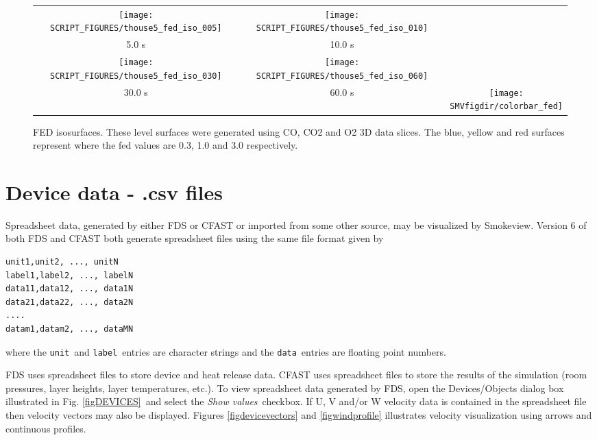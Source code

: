 \documentclass[11pt,twoside]{book}
\newcommand{\figheightAbar}{2.2in}
\begin{document}
\begin{figure}[bph]
\begin{center}
\begin{tabular}{ccc}
\texttt{[image: SCRIPT\_FIGURES/thouse5\_fed\_iso\_005]}&
\texttt{[image: SCRIPT\_FIGURES/thouse5\_fed\_iso\_010]}\\
5.0 s&10.0 s\\
\texttt{[image: SCRIPT\_FIGURES/thouse5\_fed\_iso\_030]}&
\texttt{[image: SCRIPT\_FIGURES/thouse5\_fed\_iso\_060]}&\\
30.0 s&60.0 s
&\raisebox{0.0ex}[0pt]{\texttt{[image: \\SMVfigdir/colorbar\_fed]}}\\
\end{tabular}
\caption [FED slices.]
{FED isosurfaces.
These level surfaces were generated using CO, CO2 and O2 3D data slices.
The blue, yellow and red surfaces represent where the
fed values are 0.3, 1.0 and 3.0 respectively.
}
\label{figfediso}%
\end{center}
\end{figure}

\section{Device data - .csv files}
Spreadsheet data, generated by either FDS or CFAST or imported from some
other source, may be visualized by Smokeview.
Version 6 of both FDS and CFAST
both generate spreadsheet files using the same file format given by
\begin{lstlisting}
unit1,unit2, ..., unitN
label1,label2, ..., labelN
data11,data12, ..., data1N
data21,data22, ..., data2N
....
datam1,datam2, ..., dataMN
\end{lstlisting}
where the {\tt unit}\ and {\tt label}\ entries are character strings and the
{\tt data}\ entries are floating point numbers.

FDS uses spreadsheet files to store device and heat release data.
CFAST uses spreadsheet files to store the results of the
simulation (room pressures, layer heights, layer temperatures,
etc.). To view spreadsheet data generated by FDS, open the
Devices/Objects dialog box illustrated in Fig.
\ref{figDEVICES}\ and select the {\em Show values}\ checkbox. If U,
V and/or W velocity data is contained in the spreadsheet file then
velocity vectors may also be displayed. Figures \ref{figdevicevectors} and
\ref{figwindprofile} illustrates velocity visualization using arrows and continuous profiles.
\end{document}

